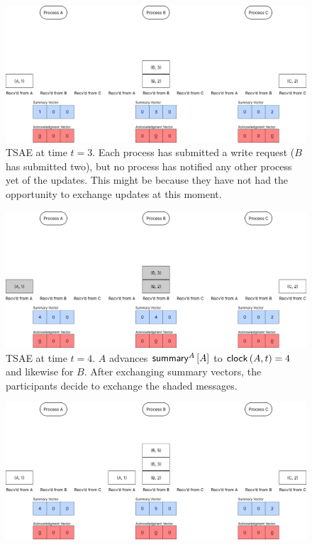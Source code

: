 \documentclass[]             %
{NASA}                       %
\theoremstyle{definition}
\begin{document}
\begin{landscape}
  \begin{figure}[h]%
  \end{figure}
  \begin{figure}[h]
    \centering
    \includegraphics[width=1.4\textwidth]{images/tsae/TSAE3.png}
    \caption{TSAE at time $t=3$. Each process has submitted a write request ($B$ has submitted two), but no process has notified any other process yet of the updates. This might be because they have not had the opportunity to exchange updates at this moment.}
    \label{fig:tsae1}
  \end{figure}
  \begin{figure}[h]
    \centering
    \includegraphics[width=1.4\textwidth]{images/tsae/TSAE4.png}
    \caption{TSAE at time $t=4$. $A$ advances $\mathsf{summary}^{A}\left[A\right]$ to $\mathsf{clock}\left(A, t\right) = 4$ and likewise for $B$. After exchanging summary vectors, the participants decide to exchange the shaded messages.}
    \label{fig:tsae2}
  \end{figure}
  \begin{figure}[h]
    \centering
    \includegraphics[width=1.4\textwidth]{images/tsae/TSAE5.png}

\end{figure}
\end{landscape}
\end{document}
